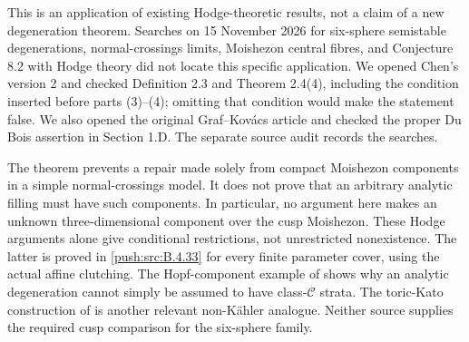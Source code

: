 This is an application of existing Hodge-theoretic results, not
a claim of a new degeneration theorem. Searches on 15 November
2026 for six-sphere semistable degenerations, normal-crossings
limits, Moishezon central fibres, and Conjecture 8.2 with Hodge
theory did not locate this specific application. We opened
Chen's version 2 and checked Definition 2.3
and Theorem 2.4(4), including the condition inserted before
parts (3)--(4); omitting that condition would make the
statement false. We also opened the original Graf--Kov\'acs
article and checked the proper Du Bois assertion in Section
1.D. The separate source audit records the searches.

The theorem prevents a repair made solely from compact
Moishezon components in a simple normal-crossings model.
It does not prove that an arbitrary analytic filling must have
such components. In particular, no argument here makes an
unknown three-dimensional component over the cusp Moishezon.
These Hodge arguments alone give conditional restrictions, not
unrestricted nonexistence. The latter is proved in \ref{push:src:B.4.33} for
every finite parameter cover, using the actual affine clutching.
The Hopf-component example of
\citet[Theorem 1.4, preprint p.~7, and Example 2.1, p.~13]{Nishiguchi1988IIRoot}
shows why an analytic degeneration cannot simply be assumed to
have class-$\mathcal C$ strata. The toric-Kato construction of
\citet[Theorem 7.1]{IstratiEtAl2022Root} is another relevant
non-K\"ahler analogue. Neither source supplies the required
cusp comparison for the six-sphere family.

